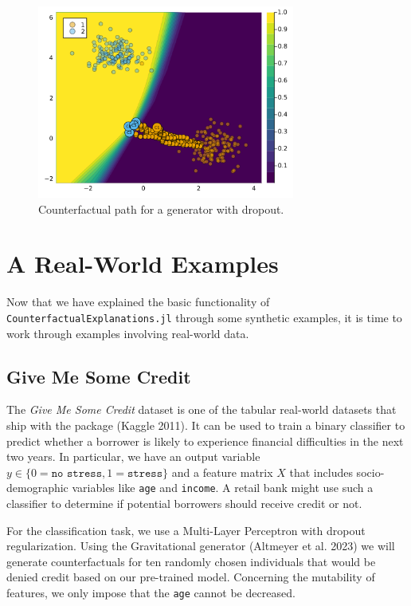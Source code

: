 \documentclass{juliacon}
\begin{document}
\begin{figure}

{\centering \includegraphics[width=3.33333in,height=2.5in]{www/dropout.png}

}

\caption{\label{fig-dropout}Counterfactual path for a generator with
dropout.}

\end{figure}

\hypertarget{sec-emp}{%
\section{A Real-World Examples}\label{sec-emp}}

Now that we have explained the basic functionality of
\texttt{CounterfactualExplanations.jl} through some synthetic examples,
it is time to work through examples involving real-world data.

\hypertarget{give-me-some-credit}{%
\subsection{Give Me Some Credit}\label{give-me-some-credit}}

The \emph{Give Me Some Credit} dataset is one of the tabular real-world
datasets that ship with the package (Kaggle 2011). It can be used to
train a binary classifier to predict whether a borrower is likely to
experience financial difficulties in the next two years. In particular,
we have an output variable
\(y \in \{0=\texttt{no stress},1=\texttt{stress}\}\) and a feature
matrix \(X\) that includes socio-demographic variables like \texttt{age}
and \texttt{income}. A retail bank might use such a classifier to
determine if potential borrowers should receive credit or not.

For the classification task, we use a Multi-Layer Perceptron with
dropout regularization. Using the Gravitational generator (Altmeyer et
al. 2023) we will generate counterfactuals for ten randomly chosen
individuals that would be denied credit based on our pre-trained model.
Concerning the mutability of features, we only impose that the
\texttt{age} cannot be decreased.
\end{document}
